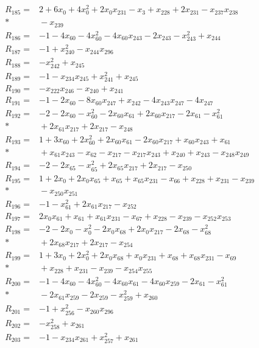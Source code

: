 \begin{align*}
R_{185}={}&2+6x_{0}+4x_{0}^{2}+2x_{0}x_{231}-x_{3}+x_{228}+2x_{231}-x_{237}x_{238}\\*
&{}-x_{239}\\[3pt]
R_{186}={}&-1-4x_{60}-4x_{60}^{2}-4x_{60}x_{243}-2x_{243}-x_{243}^{2}+x_{244}\\[3pt]
R_{187}={}&-1+x_{240}^{2}-x_{244}x_{296}\\[3pt]
R_{188}={}&-x_{242}^{2}+x_{245}\\[3pt]
R_{189}={}&-1-x_{234}x_{245}+x_{241}^{2}+x_{245}\\[3pt]
R_{190}={}&-x_{222}x_{246}-x_{240}+x_{241}\\[3pt]
R_{191}={}&-1-2x_{60}-8x_{60}x_{247}+x_{242}-4x_{243}x_{247}-4x_{247}\\[3pt]
R_{192}={}&-2-2x_{60}-x_{60}^{2}-2x_{60}x_{61}+2x_{60}x_{217}-2x_{61}-x_{61}^{2}\\*
&{}+2x_{61}x_{217}+2x_{217}-x_{248}\\[3pt]
R_{193}={}&1+3x_{60}+2x_{60}^{2}+2x_{60}x_{61}-2x_{60}x_{217}+x_{60}x_{243}+x_{61}\\*
&{}+x_{61}x_{243}-x_{62}-x_{217}-x_{217}x_{243}+x_{240}+x_{243}-x_{248}x_{249}\\[3pt]
R_{194}={}&-2-2x_{65}-x_{65}^{2}+2x_{65}x_{217}+2x_{217}-x_{250}\\[3pt]
R_{195}={}&1+2x_{0}+2x_{0}x_{65}+x_{65}+x_{65}x_{231}-x_{66}+x_{228}+x_{231}-x_{239}\\*
&{}-x_{250}x_{251}\\[3pt]
R_{196}={}&-1-x_{61}^{2}+2x_{61}x_{217}-x_{252}\\[3pt]
R_{197}={}&2x_{0}x_{61}+x_{61}+x_{61}x_{231}-x_{67}+x_{228}-x_{239}-x_{252}x_{253}\\[3pt]
R_{198}={}&-2-2x_{0}-x_{0}^{2}-2x_{0}x_{68}+2x_{0}x_{217}-2x_{68}-x_{68}^{2}\\*
&{}+2x_{68}x_{217}+2x_{217}-x_{254}\\[3pt]
R_{199}={}&1+3x_{0}+2x_{0}^{2}+2x_{0}x_{68}+x_{0}x_{231}+x_{68}+x_{68}x_{231}-x_{69}\\*
&{}+x_{228}+x_{231}-x_{239}-x_{254}x_{255}\\[3pt]
R_{200}={}&-1-4x_{60}-4x_{60}^{2}-4x_{60}x_{61}-4x_{60}x_{259}-2x_{61}-x_{61}^{2}\\*
&{}-2x_{61}x_{259}-2x_{259}-x_{259}^{2}+x_{260}\\[3pt]
R_{201}={}&-1+x_{256}^{2}-x_{260}x_{296}\\[3pt]
R_{202}={}&-x_{258}^{2}+x_{261}\\[3pt]
R_{203}={}&-1-x_{234}x_{261}+x_{257}^{2}+x_{261}\\[3pt]

\end{align*}
